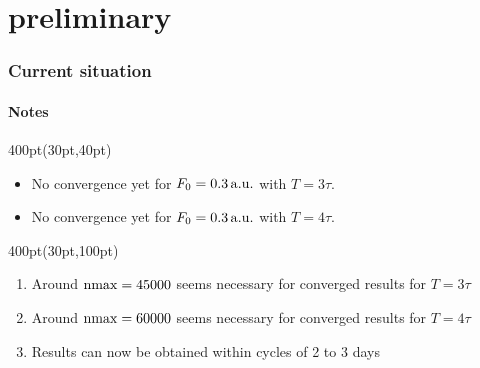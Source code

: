 \section{preliminary}

\begin{frame}
\frametitle{Current situation}
	\framesubtitle{Notes}
\footnotesize


\begin{textblock*}{400pt}(30pt,40pt)

\begin{itemize}
\footnotesize
\item No convergence yet for $F_0=0.3\,\rm a.u.$ with $T=3\tau$.
\item No convergence yet for $F_0=0.3\,\rm a.u.$ with $T=4\tau$.
\end{itemize}
\end{textblock*}


\begin{textblock*}{400pt}(30pt,100pt)
  \begin{enumerate}
  \footnotesize
\item Around ${\rm nmax}=45000$ seems necessary for converged results 
for $T=3\tau$
\item Around ${\rm nmax}=60000$ seems necessary for converged results 
for $T=4\tau$
\item Results can now be obtained within cycles of 2 to 3 days
  \end{enumerate}

\end{textblock*}



\end{frame}
